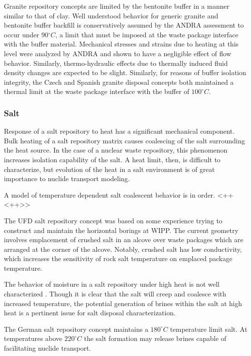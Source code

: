 Granite repository concepts are limited by the bentonite buffer in a manner 
similar to that of clay. 
Well understood behavior for generic granite and bentonite buffer backfill
is conservatively assumed by the \gls{ANDRA} assessment to occur under 
90$^\circ C$, a limit that must be imposed at the waste package interface with 
the buffer material.  Mechanical stresses and strains due to heating at this 
level were analyzed by \gls{ANDRA} and shown to have a negligible effect of 
flow behavior. Similarly, thermo-hydraulic effects due to thermally induced 
fluid density changes are expected to be slight. \cite{andra_argile:_2005}
Similarly, for reasons of buffer isolation integrity, the Czech and Spanish
granite disposal concepts both maintained a thermal limit at the waste package
interface with the buffer of $100^\circ C$.  \cite{von_lensa_red-impact_2008}

\subsubsection{Salt} 

Response of a salt repository to heat has a significant
mechanical component. Bulk heating of a salt repository matrix causes
coalescing  of the salt surrounding the heat source. In the case of a nuclear
waste repository, this phenomenon increases isolation capability of the salt. A
heat limit, then, is difficult to characterize, but evolution of the heat in a
salt environment is of great importance to nuclide transport modeling. 

A model of temperature dependent salt coalescent behavior is in order.  <++ <++>>

The \gls{UFD} salt repository concept was based on some 
experience trying to construct and maintain the horizontal borings at WIPP. The 
current geometry involves emplacement of crushed salt in an alcove over waste
packages which are arranged at the corner of the alcove. Notably,  crushed salt 
has low conductivity, which increases the sensitivity of rock salt temperature 
on emplaced package temperature. 

The behavior of moisture in a salt repository under high heat is not well 
characterized . Though it is clear that the salt will creep and coalesce with 
increased temperature, the potential generation of brines within the salt at 
high heat is a pertinent issue for salt disposal characterization. 

The German salt repository concept maintains a $180^\circ C$ temperature limit 
salt. At temperatures above $220^\circ C$ the salt formation may release 
brines capable of facilitating nuclide transport.
\cite{von_lensa_red-impact_2008}\cite{brewitz_long_2002}


